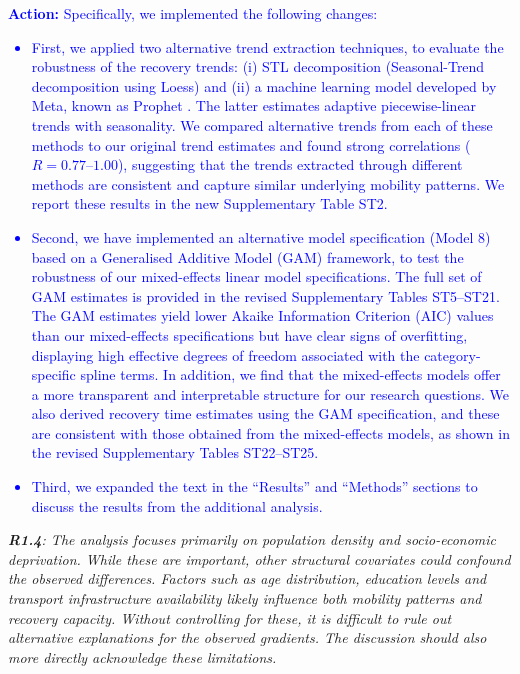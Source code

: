 \documentclass[12pt,a4paper,oneside, reqno]{amsart}
\begin{document}
\textcolor{blue}{
\textbf{Action:} Specifically, we implemented the following changes: 
\begin{itemize}[noitemsep, topsep=0pt]
    \item First, we applied two alternative trend extraction techniques, to evaluate the robustness of the recovery trends: (i) STL decomposition (Seasonal-Trend decomposition using Loess) \parencite{cleveland1990stl} and (ii) a machine learning model developed by Meta, known as Prophet \parencite{prophet17}. The latter estimates adaptive piecewise-linear trends with seasonality. We compared alternative trends from each of these methods to our original trend estimates and found strong correlations ($R = 0.77–1.00$), suggesting that the trends extracted through different methods are consistent and capture similar underlying mobility patterns. We report these results in the new Supplementary Table ST2.
    \item Second, we have implemented an alternative model specification (Model 8) based on a Generalised Additive Model (GAM) framework, to test the robustness of our mixed-effects linear model specifications. The full set of GAM estimates is provided in the revised Supplementary Tables ST5–ST21. The GAM estimates yield lower Akaike Information Criterion (AIC) values than our mixed-effects specifications but have clear signs of overfitting, displaying high effective degrees of freedom associated with the category-specific spline terms. In addition, we find that the mixed-effects models offer a more transparent and interpretable structure for our research questions. We also derived recovery time estimates using the GAM specification, and these are consistent with those obtained from the mixed-effects models, as shown in the revised Supplementary Tables ST22–ST25. 
    \item Third, we expanded the text in the ``Results'' and ``Methods'' sections to discuss the results from the additional analysis.
\end{itemize}
}

\setlength{\leftskip}{0cm} \textit{\textbf{R1.4}: The analysis focuses primarily on population density and socio-economic deprivation. While these are important, other structural covariates could confound the observed differences. Factors such as age distribution, education levels and transport infrastructure availability likely influence both mobility patterns and recovery capacity. Without controlling for these, it is difficult to rule out alternative explanations for the observed gradients. The discussion should also more directly acknowledge these limitations.
}
\end{document}
